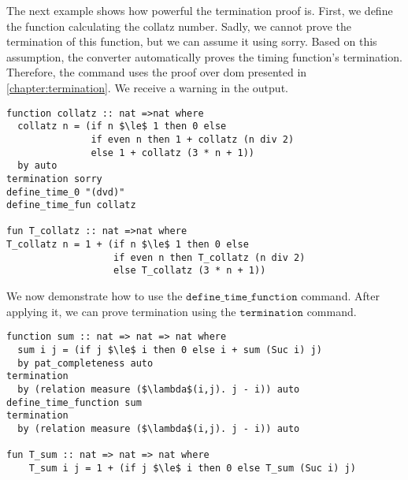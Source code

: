 The next example shows how powerful the termination proof is.
First, we define the function calculating the collatz number.
Sadly, we cannot prove the termination of this function, but we can assume it using sorry.
Based on this assumption, the converter automatically proves the timing function's termination.
Therefore, the command uses the proof over dom presented in \autoref{chapter:termination}.
We receive a warning in the output.
\begin{lstlisting}[language=isabelle,mathescape=true,keepspaces]
function collatz :: nat =>nat where
  collatz n = (if n $\le$ 1 then 0 else
               if even n then 1 + collatz (n div 2)
               else 1 + collatz (3 * n + 1))
  by auto
termination sorry
define_time_0 "(dvd)"
define_time_fun collatz

fun T_collatz :: nat =>nat where
T_collatz n = 1 + (if n $\le$ 1 then 0 else
                   if even n then T_collatz (n div 2)
                   else T_collatz (3 * n + 1))
\end{lstlisting}

We now demonstrate how to use the $\texttt{define\_time\_function}$ command.
After applying it, we can prove termination using the $\texttt{termination}$ command.

\begin{lstlisting}[language=isabelle,mathescape=true]
function sum :: nat => nat => nat where
  sum i j = (if j $\le$ i then 0 else i + sum (Suc i) j)
  by pat_completeness auto
termination
  by (relation measure ($\lambda$(i,j). j - i)) auto
define_time_function sum
termination
  by (relation measure ($\lambda$(i,j). j - i)) auto

fun T_sum :: nat => nat => nat where
    T_sum i j = 1 + (if j $\le$ i then 0 else T_sum (Suc i) j)
\end{lstlisting}
